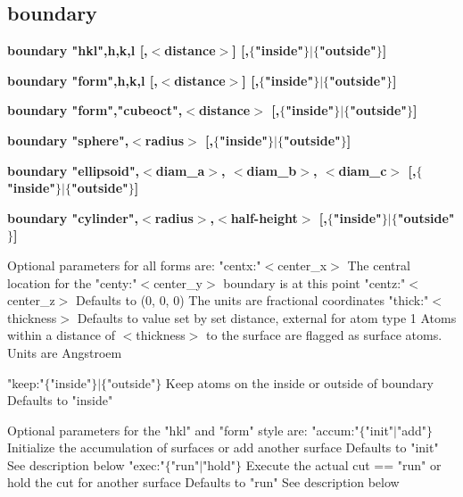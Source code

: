 \subsection*{boundary}
{\bf boundary "hkl",h,k,l [,$ <$distance$> $] [,$ \{$"inside"$\} $$| $$ \{$"outside"$\} $] \par }
{\bf boundary "form",h,k,l [,$ <$distance$> $] [,$ \{$"inside"$\} $$| $$ \{$"outside"$\} $] \par }
{\bf boundary "form","cubeoct",$ <$distance$> $ [,$ \{$"inside"$\} $$| $$ \{$"outside"$\} $] \par }
{\bf boundary "sphere",$ <$radius$> $ [,$ \{$"inside"$\} $$| $$ \{$"outside"$\} $] \par }
{\bf boundary "ellipsoid",$ <$diam\_a$> $, $ <$diam\_b$> $, $ <$diam\_c$> $ [,$ \{$"inside"$\} $$| $$ \{$"outside"$\} $] \par }
{\bf boundary "cylinder",$ <$radius$> $,$ <$half-height$> $ [,$ \{$"inside"$\} $$| $$ \{$"outside"$\} $] \par }
\vspace{3pt}
         Optional parameters for all forms are: 
         "centx:"$ <$center\_x$> $   The central location for the 
         "centy:"$ <$center\_y$> $   boundary is at this point 
         "centz:"$ <$center\_z$> $   Defaults to (0, 0, 0) 
                              The units are fractional coordinates 
         "thick:"$ <$thickness$> $  Defaults to value set by 
                              set distance, external for atom type 1 
                              Atoms within a distance of $ <$thickness$> $ 
                              to the surface are flagged as surface 
                              atoms. Units are Angstroem 
\par
         "keep:"$ \{$"inside"$\} $$| $$ \{$"outside"$\} $  Keep atoms on the inside or 
                                        outside of boundary 
                                        Defaults to "inside" 
\par
         Optional parameters for the "hkl" and "form" style are: 
         "accum:"$ \{$"init"$| $"add"$\} $  Initialize the accumulation of 
                                 surfaces or add another surface 
                                 Defaults to "init" 
                                 See description below 
         "exec:"$ \{$"run"$| $"hold"$\} $   Execute the actual cut == "run" 
                                 or hold the cut for another 
                                 surface 
                                 Defaults to "run" 
                                 See description below 
